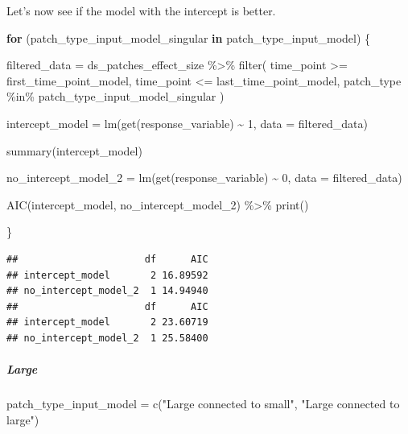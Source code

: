 \documentclass[
]{article}
\newenvironment{Shaded}{\begin{snugshade}}{\end{snugshade}}
\newcommand{\AttributeTok}[1]{\textcolor[rgb]{0.77,0.63,0.00}{#1}}
\newcommand{\ControlFlowTok}[1]{\textcolor[rgb]{0.13,0.29,0.53}{\textbf{#1}}}
\newcommand{\DecValTok}[1]{\textcolor[rgb]{0.00,0.00,0.81}{#1}}
\newcommand{\FunctionTok}[1]{\textcolor[rgb]{0.00,0.00,0.00}{#1}}
\newcommand{\NormalTok}[1]{#1}
\newcommand{\OtherTok}[1]{\textcolor[rgb]{0.56,0.35,0.01}{#1}}
\newcommand{\SpecialCharTok}[1]{\textcolor[rgb]{0.00,0.00,0.00}{#1}}
\newcommand{\StringTok}[1]{\textcolor[rgb]{0.31,0.60,0.02}{#1}}
\begin{document}
Let's now see if the model with the intercept is better.

\begin{Shaded}
\begin{Highlighting}[]
\ControlFlowTok{for}\NormalTok{ (patch\_type\_input\_model\_singular }\ControlFlowTok{in}\NormalTok{ patch\_type\_input\_model) \{}
  
\NormalTok{  filtered\_data }\OtherTok{=}\NormalTok{ ds\_patches\_effect\_size }\SpecialCharTok{\%\textgreater{}\%}
    \FunctionTok{filter}\NormalTok{(}
\NormalTok{        time\_point }\SpecialCharTok{\textgreater{}=}\NormalTok{ first\_time\_point\_model,}
\NormalTok{        time\_point }\SpecialCharTok{\textless{}=}\NormalTok{ last\_time\_point\_model,}
\NormalTok{        patch\_type }\SpecialCharTok{\%in\%}\NormalTok{ patch\_type\_input\_model\_singular}
\NormalTok{    )}
  
\NormalTok{  intercept\_model }\OtherTok{=} \FunctionTok{lm}\NormalTok{(}\FunctionTok{get}\NormalTok{(response\_variable) }\SpecialCharTok{\textasciitilde{}}
                         \DecValTok{1}\NormalTok{,}
                       \AttributeTok{data =}\NormalTok{ filtered\_data)}
  
  \FunctionTok{summary}\NormalTok{(intercept\_model)}
  
\NormalTok{  no\_intercept\_model\_2 }\OtherTok{=} \FunctionTok{lm}\NormalTok{(}\FunctionTok{get}\NormalTok{(response\_variable) }\SpecialCharTok{\textasciitilde{}}
                              \DecValTok{0}\NormalTok{,}
                            \AttributeTok{data =}\NormalTok{ filtered\_data)}
  
  \FunctionTok{AIC}\NormalTok{(intercept\_model, no\_intercept\_model\_2) }\SpecialCharTok{\%\textgreater{}\%}
    \FunctionTok{print}\NormalTok{()}
  
\NormalTok{\}}
\end{Highlighting}
\end{Shaded}

\begin{verbatim}
##                      df      AIC
## intercept_model       2 16.89592
## no_intercept_model_2  1 14.94940
##                      df      AIC
## intercept_model       2 23.60719
## no_intercept_model_2  1 25.58400
\end{verbatim}

\hypertarget{large-3}{%
\subparagraph{Large}\label{large-3}}

\begin{Shaded}
\begin{Highlighting}[]
\NormalTok{patch\_type\_input\_model }\OtherTok{=} \FunctionTok{c}\NormalTok{(}\StringTok{"Large connected to small"}\NormalTok{,}
                           \StringTok{"Large connected to large"}\NormalTok{)}
\end{Highlighting}
\end{Shaded}
\end{document}
